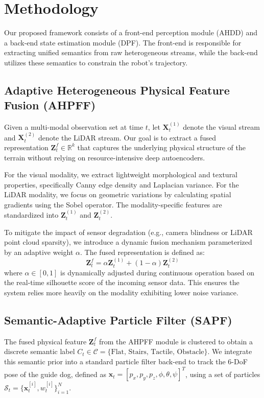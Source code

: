 \documentclass[final,3p,times]{elsarticle}
\begin{document}
\section{Methodology}
\label{sec:methodology}
Our proposed framework consists of a front-end perception module (AHDD) and a back-end state estimation module (DPF). The front-end is responsible for extracting unified semantics from raw heterogeneous streams, while the back-end utilizes these semantics to constrain the robot's trajectory.

\subsection{Adaptive Heterogeneous Physical Feature Fusion (AHPFF)}
Given a multi-modal observation set at time $t$, let $\mathbf{X}^{(1)}_t$ denote the visual stream and $\mathbf{X}^{(2)}_t$ denote the LiDAR stream. Our goal is to extract a fused representation $\mathbf{Z}^f_t \in \mathbb{R}^k$ that captures the underlying physical structure of the terrain without relying on resource-intensive deep autoencoders.

For the visual modality, we extract lightweight morphological and textural properties, specifically Canny edge density and Laplacian variance. For the LiDAR modality, we focus on geometric variations by calculating spatial gradients using the Sobel operator. The modality-specific features are standardized into $\mathbf{Z}^{(1)}_t$ and $\mathbf{Z}^{(2)}_t$.

To mitigate the impact of sensor degradation (e.g., camera blindness or LiDAR point cloud sparsity), we introduce a dynamic fusion mechanism parameterized by an adaptive weight $\alpha$. The fused representation is defined as:
\begin{equation}
    \mathbf{Z}^f_t = \alpha \mathbf{Z}^{(1)}_t + (1 - \alpha) \mathbf{Z}^{(2)}_t
\end{equation}
where $\alpha \in [0, 1]$ is dynamically adjusted during continuous operation based on the real-time silhouette score of the incoming sensor data. This ensures the system relies more heavily on the modality exhibiting lower noise variance.

\subsection{Semantic-Adaptive Particle Filter (SAPF)}
The fused physical feature $\mathbf{Z}^f_t$ from the AHPFF module is clustered to obtain a discrete semantic label $C_t \in \mathcal{C} = \{\text{Flat, Stairs, Tactile, Obstacle}\}$. We integrate this semantic prior into a standard particle filter back-end to track the 6-DoF pose of the guide dog, defined as $\mathbf{x}_t = [p_x, p_y, p_z, \phi, \theta, \psi]^T$, using a set of particles $\mathcal{S}_t = \{ \mathbf{x}^{[i]}_t, w^{[i]}_t \}_{i=1}^N$.
\end{document}
